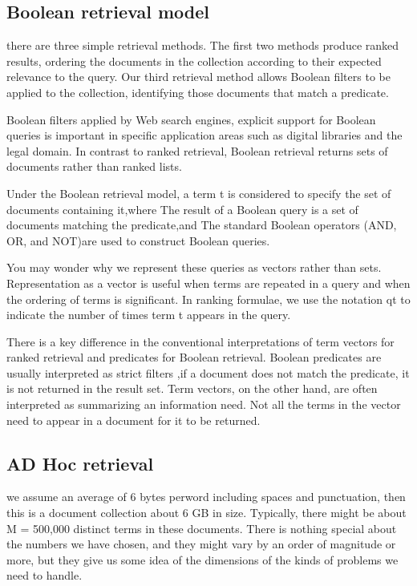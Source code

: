 \subsection{Boolean retrieval model}

 there are three simple retrieval methods. The first two methods produce ranked results, ordering the documents in the collection according to their expected relevance to the query. Our third retrieval method allows Boolean filters to be applied to the collection, identifying those documents that match a predicate.
 
Boolean filters applied by Web search engines, explicit support for Boolean queries is important in specific application areas such as digital libraries and the legal domain. In contrast to ranked retrieval, Boolean retrieval returns sets of documents rather than ranked lists.

Under the Boolean retrieval model, a term t is considered to specify the set of documents containing it,where The result of a Boolean query is a set of documents matching the predicate,and The standard Boolean operators (AND, OR, and NOT)are used to construct Boolean queries.

You may wonder why we represent these queries as vectors rather than sets. Representation as a vector is useful when terms are repeated in a query and when the ordering of terms is significant. In ranking formulae, we use the notation qt to indicate the number of times term t appears in the query.

There is a key difference in the conventional interpretations of term vectors for ranked retrieval and predicates for Boolean retrieval. Boolean predicates are usually interpreted as strict filters ,if a document does not match the predicate, it is not returned in the result set. Term vectors, on the other hand, are often interpreted as summarizing an information need. Not all the terms in the vector need to appear in a document for it to be returned. 

\subsection{AD Hoc retrieval}

we assume an average of 6 bytes perword including spaces and punctuation,
then this is a document collection about 6 GB in size. Typically, there might
be about M = 500,000 distinct terms in these documents. There is nothing
special about the numbers we have chosen, and they might vary by an order
of magnitude or more, but they give us some idea of the dimensions of the
kinds of problems we need to handle. 

